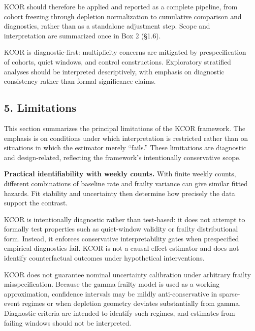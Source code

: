 \documentclass[
]{article}
\begin{document}
KCOR should therefore be applied and reported as a complete pipeline, from cohort freezing through depletion normalization to cumulative comparison and diagnostics, rather than as a standalone adjustment step. Scope and interpretation are summarized once in Box 2 (§1.6).

KCOR is diagnostic-first: multiplicity concerns are mitigated by prespecification of cohorts, quiet windows, and control constructions. Exploratory stratified analyses should be interpreted descriptively, with emphasis on diagnostic consistency rather than formal significance claims.

\subsection{5. Limitations}\label{limitations}

This section summarizes the principal limitations of the KCOR framework. The emphasis is on conditions under which interpretation is restricted rather than on situations in which the estimator merely ``fails.'' These limitations are diagnostic and design-related, reflecting the framework's intentionally conservative scope.

\textbf{Practical identifiability with weekly counts.} With finite weekly counts, different combinations of baseline rate and frailty variance can give similar fitted hazards. Fit stability and uncertainty then determine how precisely the data support the contrast.

KCOR is intentionally diagnostic rather than test-based: it does not attempt to formally test properties such as quiet-window validity or frailty distributional form. Instead, it enforces conservative interpretability gates when prespecified empirical diagnostics fail. KCOR is not a causal effect estimator and does not identify counterfactual outcomes under hypothetical interventions.

KCOR does not guarantee nominal uncertainty calibration under arbitrary frailty misspecification. Because the gamma frailty model is used as a working approximation, confidence intervals may be mildly anti-conservative in sparse-event regimes or when depletion geometry deviates substantially from gamma. Diagnostic criteria are intended to identify such regimes, and estimates from failing windows should not be interpreted.
\end{document}
